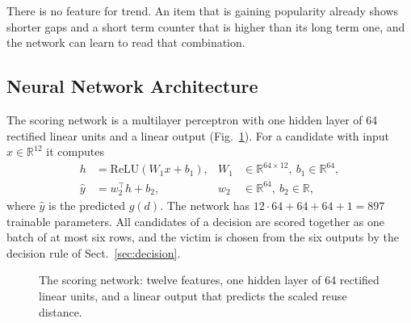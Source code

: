 \documentclass{llncs}
\begin{document}
There is no feature for trend. An item that is gaining popularity already shows shorter gaps and a short term counter that is higher than its long term one, and the network can learn to read that combination.

\subsection{Neural Network Architecture}
\label{sec:model}

The scoring network is a multilayer perceptron with one hidden layer of 64 rectified linear units and a linear output (Fig.~\ref{fig:network}). For a candidate with input $x \in \mathbb{R}^{12}$ it computes
\begin{align}
h &= \mathrm{ReLU}(W_1 x + b_1), & W_1 &\in \mathbb{R}^{64 \times 12},\ b_1 \in \mathbb{R}^{64},\\
\hat{y} &= w_2^\top h + b_2, & w_2 &\in \mathbb{R}^{64},\ b_2 \in \mathbb{R},
\end{align}
where $\hat{y}$ is the predicted $g(d)$. The network has $12 \cdot 64 + 64 + 64 + 1 = 897$ trainable parameters. All candidates of a decision are scored together as one batch of at most six rows, and the victim is chosen from the six outputs by the decision rule of Sect.~\ref{sec:decision}.

\begin{figure}[htbp]
\centering
{}
\caption{The scoring network: twelve features, one hidden layer of 64 rectified linear units, and a linear output that predicts the scaled reuse distance.}
\label{fig:network}
\end{figure}
\end{document}
